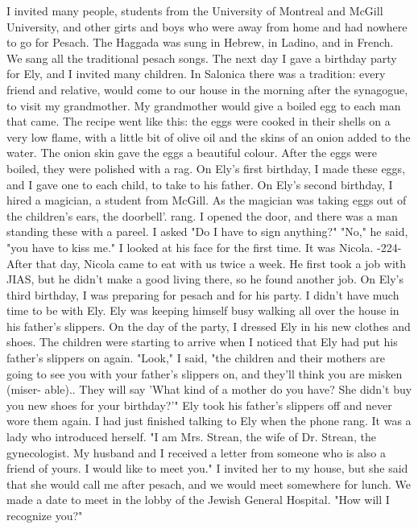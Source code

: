 I invited many people, students from the University of Montreal and McGill University, and other girts and boys who were away from home and had nowhere to go for Pesach.
The Haggada was sung in Hebrew, 
in Ladino, and in French.
We sang all the traditional pesach songs.
The next day I gave a birthday party for Ely, and I invited many 
children.
In Salonica there was a tradition: every friend and relative, 
would come to our house in the morning after the synagogue, to visit 
my grandmother.
My grandmother would give a boiled egg to each man that 
came.
The recipe went like this: the eggs were cooked in their shells 
on a very low flame, with a little bit of olive oil and the skins of 
an onion added to the water.
The onion skin gave the eggs a beautiful 
colour.
After the eggs were boiled, they were polished with a rag.
On 
Ely's first birthday, I made these eggs, and I gave one to each child, to 
take to his father.
On Ely's second birthday, I hired a magician, a student from McGill.
As the magician was taking eggs out of the children's ears, the doorbell'.
rang.
I opened the door, and there was a man standing these with a pareel.
I asked "Do I have to sign anything?"
"No," he said, "you have to kiss me."
I looked at his face for the 
first time.
It was Nicola.
-224- 
After that day, Nicola came to eat with us twice a week.
He 
first took a job with JIAS, but he didn't make a good living there, 
so he found another job.
On Ely's third birthday, I was preparing for pesach and for his 
party.
I didn't have much time to be with Ely.
Ely was keeping himself 
busy walking all over the house in his father's slippers.
On the day of 
the party, I dressed Ely in his new clothes and shoes.
The children were 
starting to arrive when I noticed that Ely had put his father's slippers 
on again.
"Look," I said, "the children and their mothers are going to see you 
with your father's slippers on, and they'll think you are misken (miser-
able).. They will say 'What kind of a mother do you have?
She didn't 
buy you new shoes for your birthday?'"
Ely took his father's slippers 
off and never wore them again.
I had just finished talking to Ely when the phone rang.
It was a 
lady who introduced herself.
"I am Mrs.
Strean, the wife of Dr.
Strean, 
the gynecologist.
My husband and I received a letter from someone who 
is also a friend of yours.
I would like to meet you."
I invited her to 
my house, but she said that she would call me after pesach, and we would 
meet somewhere for lunch.
We made a date to meet in the lobby of the 
Jewish General Hospital.
"How will I recognize you?"
